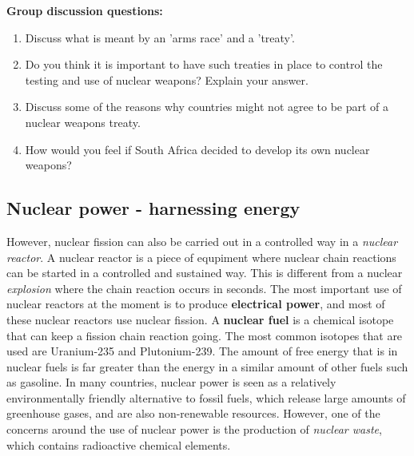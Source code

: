 {\textbf{Group discussion questions:\\}

\begin{enumerate}
\item{Discuss what is meant by an 'arms race' and a 'treaty'.}
\item{Do you think it is important to have such treaties in place to control the testing and use of nuclear weapons? Explain your answer.}
\item{Discuss some of the reasons why countries might not agree to be part of a nuclear weapons treaty.}
\item{How would you feel if South Africa decided to develop its own nuclear weapons?}
\end{enumerate}
}

\subsection{Nuclear power - harnessing energy}
\label{subsec:an:nfiss:power}

However, nuclear fission can also be carried out in a controlled way in a \textit{nuclear reactor}. A nuclear reactor is a piece of equpiment where nuclear chain reactions can be started in a controlled and sustained way. This is different from a nuclear \textit{explosion} where the chain reaction occurs in seconds. The most important use of nuclear reactors at the moment is to produce \textbf{electrical power}, and most of these nuclear reactors use nuclear fission. A \textbf{nuclear fuel} is a chemical isotope that can keep a fission chain reaction going. The most common isotopes that are used are Uranium-235 and Plutonium-239. The amount of free energy that is in nuclear fuels is far greater than the energy in a similar amount of other fuels such as gasoline. In many countries, nuclear power is seen as a relatively environmentally friendly alternative to fossil fuels, which release large amounts of greenhouse gases, and are also non-renewable resources. However, one of the concerns around the use of nuclear power is the production of \textit{nuclear waste}, which contains radioactive chemical elements.


